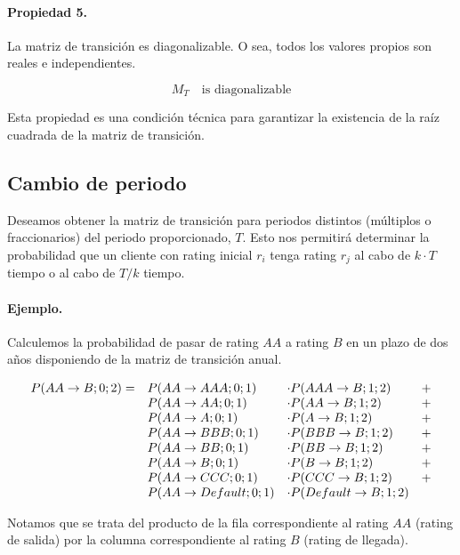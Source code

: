 \paragraph{Propiedad 5.}
La matriz de transici\'on es diagonalizable. O sea, todos los valores propios son
reales e independientes.

\begin{equation}
M_{T} \quad \textrm{is diagonalizable}
\end{equation}

Esta propiedad es una condici\'on t\'ecnica para garantizar la existencia de la
ra\'iz cuadrada de la matriz de transici\'on.


\subsection{Cambio de periodo}
\label{mtrans:perchange}

Deseamos obtener la matriz de transici\'on para periodos distintos (m\'ultiplos o 
fraccionarios) del periodo proporcionado, $T$. Esto nos permitir\'a determinar la 
probabilidad que un cliente con rating inicial $r_i$ tenga rating $r_j$ al cabo 
de $k \cdot T$ tiempo o al cabo de $T/k$ tiempo.

\paragraph{Ejemplo.} Calculemos la probabilidad de pasar de rating $AA$ a
rating $B$ en un plazo de dos a\~nos disponiendo de la matriz de transici\'on anual.

\begin{displaymath}
\begin{array}{llll}
P(AA \to B;0;2) = & P(AA \to AAA;0;1)     & \cdot P(AAA \to B;1;2)     & + \cr
                  & P(AA \to AA;0;1)      & \cdot P(AA \to B;1;2)      & + \cr
                  & P(AA \to A;0;1)       & \cdot P(A \to B;1;2)       & + \cr
                  & P(AA \to BBB;0;1)     & \cdot P(BBB \to B;1;2)     & + \cr
                  & P(AA \to BB;0;1)      & \cdot P(BB \to B;1;2)      & + \cr
                  & P(AA \to B;0;1)       & \cdot P(B \to B;1;2)       & + \cr
                  & P(AA \to CCC;0;1)     & \cdot P(CCC \to B;1;2)     & + \cr
                  & P(AA \to Default;0;1) & \cdot P(Default \to B;1;2) &
\end{array}
\end{displaymath}

Notamos que se trata del producto de la fila correspondiente al rating $AA$ 
(rating de salida) por la columna correspondiente al rating $B$ (rating de 
llegada).

